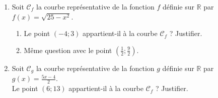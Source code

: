 \documentclass[11pt]{article}
\begin{document}
\begin{exo}
\begin{enumerate}
  \item Soit $\mathscr C_f$ la courbe représentative de la fonction $f$ définie
    sur $\mathbb{R}$ par $f(x)=\sqrt{25-x^2}$.
    \begin{enumerate}
      \item Le point $(-4;3)$ appartient-il à la courbe $\mathscr C_f$ ?
        Justifier.
      \item Même question avec le point $\left( \frac{1}{2};\frac{9}{2}
        \right)$.
    \end{enumerate}
  \item Soit $\mathscr C_g$ la courbe représentative de la fonction $g$ définie
    sur $\mathbb{R}$ par $g(x) = \frac{5x-4}{2}$.\\
    Le point $(6; 13)$ appartient-il à la courbe $\mathscr C_f$ ? Justifier.
\end{enumerate}
\end{exo}
\end{document}
